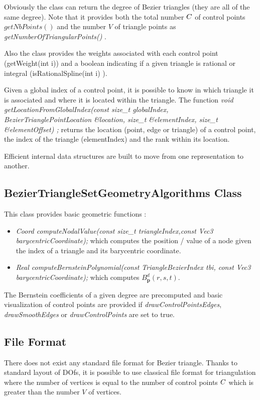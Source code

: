 \documentclass[a4paper,11pt]{article}
\begin{document}
Obviously the class can return the degree of  Bezier triangles  (they are all of the same degree). Note that it provides both the total number ${C}$ of control points $getNbPoints()$ and the number $V$ of triangle points as {\it getNumberOfTriangularPoints() }.

Also the class provides the weights associated with each control point (getWeight(int i)) and a boolean indicating if a given triangle is rational or integral (isRationalSpline(int i) ).

Given a global index of a control point, it is possible to know in which triangle it is associated and where it is located within the triangle. 
The function {\it void getLocationFromGlobalIndex(const size\_t globalIndex, BezierTrianglePointLocation \&location, 
		size\_t \&elementIndex, size\_t \&elementOffset) ;} returns the location (point, edge or triangle) of a control point, the index of the triangle (elementIndex) and the rank within its location.
		
		
Efficient internal data structures are built to move from one representation to another.


\subsection{BezierTriangleSetGeometryAlgorithms Class}

This class provides basic geometric functions :

\begin{itemize}
	\item {\it Coord computeNodalValue(const size\_t triangleIndex,const Vec3 barycentricCoordinate); } which computes the position / value of a node given the index of a triangle and its barycentric coordinate.
	\item {\it Real computeBernsteinPolynomial(const TriangleBezierIndex tbi, const Vec3 barycentricCoordinate);} which computes $B^d_{\mathbf p}(r,s,t)$.
\end{itemize}

The Bernstein coefficients of a given degree are precomputed and basic visualization of control points are provided if {\it drawControlPointsEdges},  {\it drawSmoothEdges}  or  {\it drawControlPoints} are set to true.  


\subsection{File Format}

There does not exist any standard file format for Bezier triangle. Thanks to standard layout of DOfs, it is possible to use classical file format for triangulation where the number of vertices is equal to the number of control points ${C}$  which is greater than the number $V$ of vertices.
\end{document}
